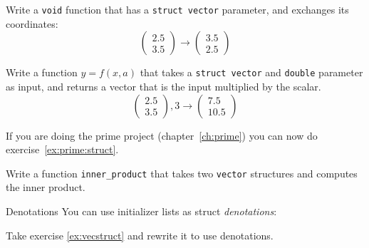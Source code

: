 \begin{exercise}
  \label{ex:vecstruct-flip}
  Write a \lstinline$void$ function that has a \lstinline$struct vector$ parameter,
  and exchanges its coordinates:
  \[ \begin{pmatrix}2.5\\3.5\end{pmatrix} \rightarrow
    \begin{pmatrix}3.5\\2.5\end{pmatrix} \]
\end{exercise}

\begin{exercise}
  \label{ex:vecstruct-scale}
  Write a function $y=f(x,a)$ that takes a \lstinline$struct vector$ and
  \lstinline$double$ parameter as input, and returns a vector that is the
  input multiplied by the scalar.
  \[ \begin{pmatrix}2.5\\3.5\end{pmatrix},3 \rightarrow
    \begin{pmatrix}7.5\\10.5\end{pmatrix} \]
\end{exercise}

\begin{exercise}
  \label{ex:primestruct}
  If you are doing the prime project (chapter~\ref{ch:prime}) you can
  now do exercise~\ref{ex:prime:struct}.
\end{exercise}

\begin{exercise}
  \label{ex:vecstruct}
  Write a function \lstinline$inner_product$ that takes two \lstinline$vector$
  structures and computes the inner product.
\end{exercise}

\begin{block}{Denotations}
  \label{sl:struct-denote}
  You can use initializer lists as struct
  \emph{denotations}:
\end{block}

\begin{exercise}
  \label{ex:struct-denote}
  Take exercise \ref{ex:vecstruct} and rewrite it to use denotations.
\end{exercise}

